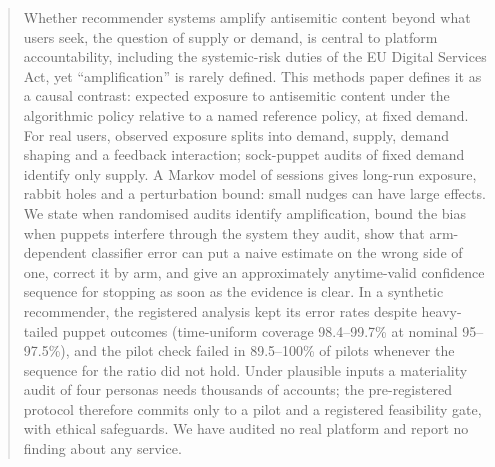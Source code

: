 \documentclass[11pt]{article}
\begin{document}
\begin{tcolorbox}[enhanced,breakable,colback=LabTint,frame hidden,boxrule=0pt,
  sharp corners,left=12pt,right=12pt,top=9pt,bottom=9pt,
  borderline west={2pt}{0pt}{LabNavy},before skip=4pt,after skip=12pt]
\begin{abstract}
Whether recommender systems amplify antisemitic content beyond what users
seek, the question of supply or demand, is central to platform
accountability, including the systemic-risk duties of the EU Digital Services
Act, yet ``amplification'' is rarely defined. This methods paper defines it as
a causal contrast: expected exposure to antisemitic content under the
algorithmic policy relative to a named reference policy, at fixed demand. For
real users, observed exposure splits into demand, supply, demand shaping and a
feedback interaction; sock-puppet audits of fixed demand identify only supply.
A Markov model of sessions gives long-run exposure, rabbit holes and a
perturbation bound: small nudges can have large effects. We state when
randomised audits identify amplification, bound the bias when puppets
interfere through the system they audit, show that arm-dependent classifier
error can put a naive estimate on the wrong side of one, correct it by arm,
and give an approximately anytime-valid confidence sequence for stopping as
soon as the evidence is clear. In a synthetic recommender, the registered
analysis kept its error rates despite heavy-tailed puppet outcomes
(time-uniform coverage 98.4--99.7\% at nominal 95--97.5\%), and the pilot
check failed in 89.5--100\% of pilots whenever the sequence for the ratio did
not hold. Under plausible inputs a materiality audit of four personas needs
thousands of accounts; the pre-registered protocol therefore commits only to a
pilot and a registered feasibility gate, with ethical safeguards. We have
audited no real platform and report no finding about any service.
\end{abstract}
\end{tcolorbox}
\suppressfloats[t]
\end{document}
